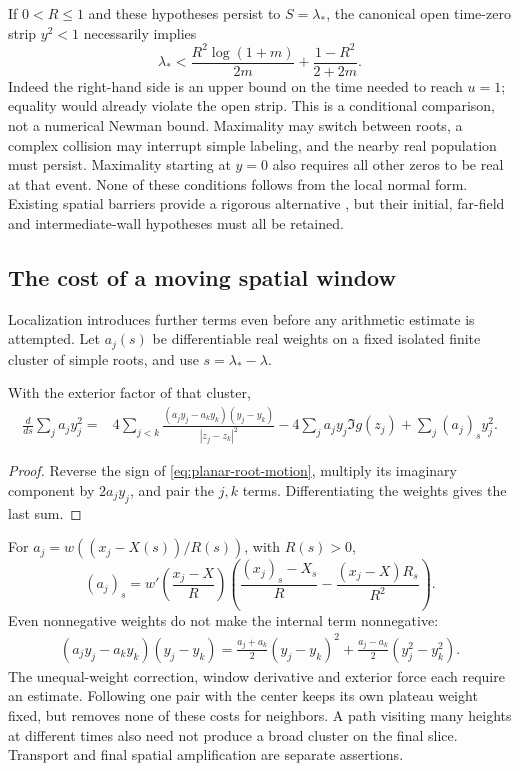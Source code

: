 If \(0<R\le1\) and these hypotheses persist to \(S=\lambda_*\),
the canonical open time-zero strip \(y^2<1\) necessarily implies
\begin{equation}\label{eq:neighbor-strip-budget}
 \lambda_*<\frac{R^2\log(1+m)}{2m}
                   +\frac{1-R^2}{2+2m}.
\end{equation}
Indeed the right-hand side is an upper bound on the time needed to
reach \(u=1\); equality would already violate the open strip.
This is a conditional comparison, not a numerical Newman bound.
Maximality may switch between roots, a complex collision may interrupt
simple labeling, and the nearby real population must persist.
Maximality starting at \(y=0\) also requires all other zeros to be
real at that event. None of these conditions follows from the local
normal form. Existing spatial barriers provide a rigorous alternative
\cite[Proposition~3.3]{Polymath2019}, but their initial, far-field and
intermediate-wall hypotheses must all be retained.

\subsection{The cost of a moving spatial window}
Localization introduces further terms even before any arithmetic
estimate is attempted. Let \(a_j(s)\) be differentiable real weights
on a fixed isolated finite cluster of simple roots, and use
\(s=\lambda_*-\lambda\).
\begin{proposition}\label{prop:weighted-balance}
With the exterior factor of that cluster,
\begin{align}
 \frac d{ds}\sum_j a_jy_j^2
 ={}&4\sum_{j<k}
 \frac{(a_jy_j-a_ky_k)(y_j-y_k)}{|z_j-z_k|^2}
 -4\sum_j a_jy_j\Im g(z_j)
 +\sum_j (a_j)_s y_j^2.
 \label{eq:weighted-balance}
\end{align}
\end{proposition}
\begin{proof}
Reverse the sign of \eqref{eq:planar-root-motion}, multiply its
imaginary component by \(2a_jy_j\), and pair the \(j,k\) terms.
Differentiating the weights gives the last sum.
\end{proof}
For \(a_j=w((x_j-X(s))/R(s))\), with \(R(s)>0\),
\begin{equation}\label{eq:window-velocity}
 (a_j)_s=w'\!\left(\frac{x_j-X}{R}\right)
 \left(\frac{(x_j)_s-X_s}{R}-\frac{(x_j-X)R_s}{R^2}\right).
\end{equation}
Even nonnegative weights do not make the internal term nonnegative:
\begin{align*}
 (a_jy_j-a_ky_k)(y_j-y_k)
 =\frac{a_j+a_k}{2}(y_j-y_k)^2
       +\frac{a_j-a_k}{2}(y_j^2-y_k^2).
\end{align*}
The unequal-weight correction, window derivative and exterior force
each require an estimate. Following one pair with the center keeps its
own plateau weight fixed, but removes none of these costs for neighbors.
A path visiting many heights at different times also need not produce
a broad cluster on the final slice. Transport and final spatial
amplification are separate assertions.
